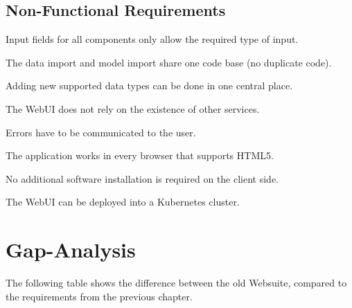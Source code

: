 \subsection{Non-Functional Requirements}
\reqstartNF
\item Input fields for all components only allow the required type of input.
\item The data import and model import share one code base (no duplicate code).
\item Adding new supported data types can be done in one central place.
\item The WebUI does not rely on the existence of other services.
\item Errors have to be communicated to the user.
\item The application works in every browser that supports HTML5.
\item No additional software installation is required on the client side.
\item The WebUI can be deployed into a Kubernetes cluster.
\reqendNF



\section{Gap-Analysis}
The following table shows the difference between the old Websuite, compared to the requirements from the previous chapter.

